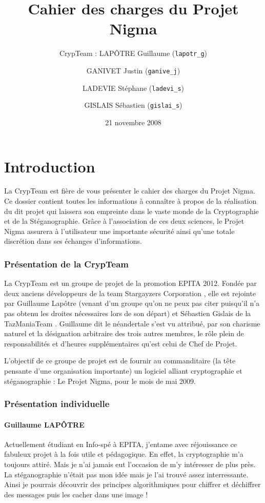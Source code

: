 \documentclass[a4paper,12pt]{article}
\title{Cahier des charges du Projet Nigma}
\author{CrypTeam : LAPÔTRE Guillaume (\texttt{lapotr\_g}) \and GANIVET Justin (\texttt{ganive\_j}) \and LADEVIE Stéphane (\texttt{ladevi\_s}) \and GISLAIS Sébastien (\texttt{gislai\_s})}
\date{21 novembre 2008}
\begin{document}
\maketitle{}
\newpage
\tableofcontents
\newpage
\part{Introduction}

La CrypTeam est fière de vous présenter le cahier des charges du Projet Nigma. Ce dossier contient toutes les informations à connaître à propos de la réalisation du dit projet qui laissera son empreinte dans le vaste monde de la Cryptographie et de la Stéganographie. Grâce à l'association de ces deux sciences, le Projet Nigma assurera à l'utilisateur une importante sécurité ainsi qu'une totale discrétion dans ses échanges d'informations. 

\section {Présentation de la CrypTeam}

La CrypTeam est un groupe de projet de la promotion EPITA 2012. Fondée par deux anciens développeurs de la team \og Stargayzers Corporation \fg{}, elle est rejointe par Guillaume Lapôtre (venant d'un groupe qu'on ne peux pas citer puisqu'il n'a pas obtenu les droites nécessaires lors de son départ) et Sébastien Gislais de la \og TazManiaTeam \fg{}. Guillaume dit \og le néandertale \fg{} s'est vu attribué, par son charisme naturel et la désignation arbitraire des trois autres membres, le rôle plein de responsabilités et d'heures supplémentaires qu'est celui de Chef de Projet.

L'objectif de ce groupe de projet est de fournir au commanditaire (la tête pensante d'une organisation importante) un logiciel alliant cryptographie et stéganographie : Le Projet Nigma, pour le mois de mai 2009.


\section {Présentation individuelle}

\subsection{Guillaume LAPÔTRE}

Actuellement étudiant en Info-spé à EPITA, j'entame avec réjouissance ce fabuleux projet à la fois utile et pédagogique. En effet, la cryptographie m'a toujours attiré. Mais je n'ai jamais eut l'occasion de m'y intéresser de plus près. La stéganographie n'était pas mon idée mais je l'ai trouvé assez interressante. Ainsi je pourrais découvrir des principes algorithmiques pour chiffrer et déchiffrer des messages puis les cacher dans une image !
\end{document}
